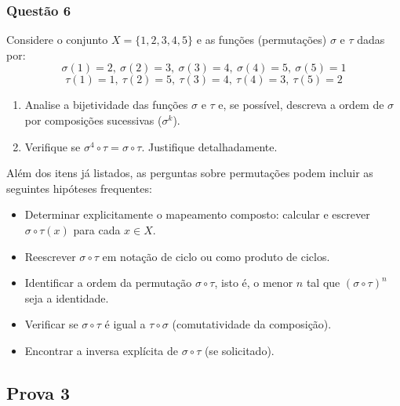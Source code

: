         \subsubsection*{Questão 6}

        Considere o conjunto $X = \{1, 2, 3, 4, 5\}$ e as funções (permutações) $\sigma$ e $\tau$ dadas por:
        \[
        \sigma(1) = 2,\ \sigma(2) = 3,\ \sigma(3) = 4,\ \sigma(4) = 5,\ \sigma(5) = 1
        \]
        \[
        \tau(1) = 1,\ \tau(2) = 5,\ \tau(3) = 4,\ \tau(4) = 3,\ \tau(5) = 2
        \]

        \begin{enumerate}[label=\alph*), left=0.5cm, align=left, nosep]
            \item Analise a bijetividade das funções $\sigma$ e $\tau$ e, se possível, descreva a ordem de $\sigma$ por composições sucessivas ($\sigma^k$).
            \item Verifique se $\sigma^4 \circ \tau = \sigma \circ \tau$. Justifique detalhadamente.
        \end{enumerate}

        Além dos itens já listados, as perguntas sobre permutações podem incluir as seguintes hipóteses frequentes:

        \begin{itemize}
            \item Determinar explicitamente o mapeamento composto: calcular e escrever $\sigma \circ \tau(x)$ para cada $x \in X$.
            \item Reescrever $\sigma \circ \tau$ em notação de ciclo ou como produto de ciclos.
            \item Identificar a ordem da permutação $\sigma \circ \tau$, isto é, o menor $n$ tal que $(\sigma \circ \tau)^n$ seja a identidade.
            \item Verificar se $\sigma \circ \tau$ é igual a $\tau \circ \sigma$ (comutatividade da composição).
            \item Encontrar a inversa explícita de $\sigma \circ \tau$ (se solicitado).
        \end{itemize}

    \subsection{Prova 3}
